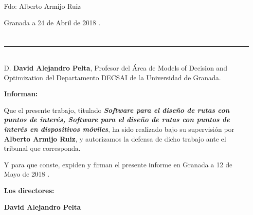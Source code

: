 \vspace{6cm}

\noindent Fdo: Alberto Armijo Ruiz

\vspace{2cm}

\begin{flushright}
Granada a 24 de Abril de 2018 .
\end{flushright}


\chapter*{}
\thispagestyle{empty}

\noindent\rule[-1ex]{\textwidth}{2pt}\\[4.5ex]

D. \textbf{David Alejandro Pelta}, Profesor del Área de Models of Decision and Optimization del Departamento DECSAI de la Universidad de Granada.

\vspace{0.5cm}

\textbf{Informan:}

\vspace{0.5cm}

Que el presente trabajo, titulado \textit{\textbf{Software para el diseño de rutas con puntos de interés, Software para el diseño de rutas con puntos de interés en dispositivos móviles}},
ha sido realizado bajo su supervisión por \textbf{Alberto Armijo Ruiz}, y autorizamos la defensa de dicho trabajo ante el tribunal
que corresponda.

\vspace{0.5cm}

Y para que conste, expiden y firman el presente informe en Granada a 12 de Mayo de 2018 .

\vspace{1cm}

\textbf{Los directores:}

\vspace{5cm}

\noindent \textbf{David Alejandro Pelta}


